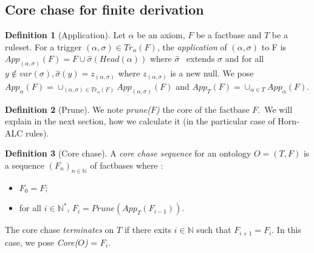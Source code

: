 \documentclass{article}
\theoremstyle{definition}
\newtheorem{definition}{Definition}[section]
\theoremstyle{remark}
\def \N {\mathbb N}
\begin{document}
\subsection{Core chase for finite derivation}

\begin{definition}[Application]
Let $\alpha$ be an axiom, $F$ be a factbase and $T$ be a ruleset. For a trigger $(\alpha,\sigma) \in Tr_\alpha(F)$, the \emph{application} of $(\alpha,\sigma)$ to F is $App_{(\alpha,\sigma)}(F) = F\cup \hat \sigma(Head(\alpha))$ where $\hat \sigma$ \ extends $\sigma$ and for all $y \notin var(\sigma), \hat \sigma(y) = z_{(\alpha,\sigma)}$ where $z_{(\alpha,\sigma)}$ is a new null.
We pose $App_{\alpha}(F) = \cup_{(\alpha,\sigma) \in Tr_\alpha(F)}App_{(\alpha,\sigma)}(F)$ and $App_{T}(F) = \cup_{\alpha \in T}App_{\alpha}(F)$.

\end{definition} 

\begin{definition}[Prune]
We note \emph{prune($F$)} the core of the factbase $F$.\ We will explain in the next section, how we calculate it (in the particular case of Horn-ALC rules).

\end{definition} 

\begin{definition}[Core chase]
A \emph{core chase sequence} for an ontology $O = (T,F)$ is a sequence $(F_n)_{n \in \N}$ of factbases where : 
\begin{itemize}
\item $F_0 = F$;
\item for all $i \in \N^*$, $F_i = Prune(App_T(F_{i-1}))$.
\end{itemize}
The core chase \emph{terminates} on $T$ if there exits $i \in \N$ such that $F_{i+1} = F_i$. In this case, we pose \emph{Core($O$)} = $F_i$.
\end{definition} 
\end{document}
